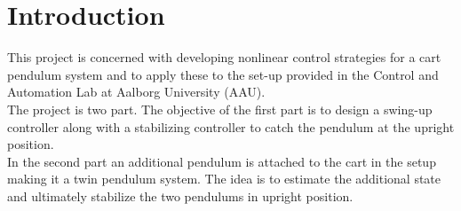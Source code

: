 %
\chapter{Introduction}\label{chap:introduction}
This project is concerned with developing nonlinear control strategies for a cart pendulum system and to apply these to the set-up provided in the Control and Automation Lab at Aalborg University (AAU).\\
The project is two part. The objective of the first part is to design a swing-up controller along with a stabilizing controller to catch the pendulum at the upright position.\\
In the second part an additional pendulum is attached to the cart in the setup making it a twin pendulum system. The idea is to estimate the additional state and ultimately stabilize the two pendulums in upright position.